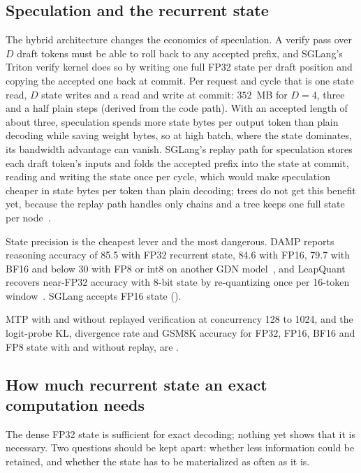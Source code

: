 \subsection{Speculation and the recurrent state}\label{sec:stack-state}
The hybrid architecture changes the economics of speculation. A verify pass over $D$ draft tokens must be able to roll back to any accepted prefix, and SGLang's Triton verify kernel does so by writing one full FP32 state per draft position and copying the accepted one back at commit. Per request and cycle that is one state read, $D$ state writes and a read and write at commit: $352$~MB for $D=4$, three and a half plain steps (derived from the code path). With an accepted length of about three, speculation spends more state bytes per output token than plain decoding while saving weight bytes, so at high batch, where the state dominates, its bandwidth advantage can vanish. SGLang's replay path for speculation stores each draft token's inputs and folds the accepted prefix into the state at commit, reading and writing the state once per cycle, which would make speculation cheaper in state bytes per token than plain decoding; trees do not get this benefit yet, because the replay path handles only chains and a tree keeps one full state per node~\cite{treewy,gdntreescan}.

State precision is the cheapest lever and the most dangerous. DAMP reports reasoning accuracy of 85.5 with FP32 recurrent state, 84.6 with FP16, 79.7 with BF16 and below 30 with FP8 or int8 on another GDN model~\cite{damp}, and LeapQuant recovers near-FP32 accuracy with 8-bit state by re-quantizing once per 16-token window~\cite{leapquant}. SGLang accepts FP16 state ().

MTP with and without replayed verification at concurrency 128 to 1024, and the logit-probe KL, divergence rate and GSM8K accuracy for FP32, FP16, BF16 and FP8 state with and without replay, are .

\subsection{How much recurrent state an exact computation needs}\label{sec:minimal-state}\label{sec:stack-state-need}
The dense FP32 state is sufficient for exact decoding; nothing yet shows that it is necessary. Two questions should be kept apart: whether less information could be retained, and whether the state has to be materialized as often as it is.

